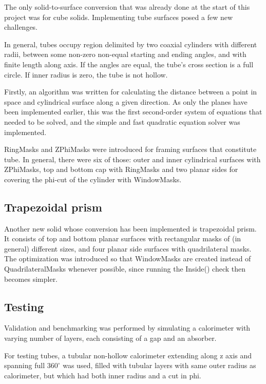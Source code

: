 \documentclass[12pt, a4paper]{article}
\begin{document}
The only solid-to-surface conversion that was already done at the start of this project was for cube solids. Implementing tube surfaces posed a few new challenges.

In general, tubes occupy region delimited by two coaxial cylinders with different radii, between some non-zero non-equal starting and ending angles, and with finite length along axis. If the angles are equal, the tube's cross section is a full circle. If inner radius is zero, the tube is not hollow.

Firstly, an algorithm was written for calculating the distance between a point in space and cylindrical surface along a given direction. As only the planes have been implemented earlier, this was the first second-order system of equations that needed to be solved, and the simple and fast quadratic equation solver was implemented.

RingMasks and ZPhiMasks were introduced for framing surfaces that constitute tube. In general, there were six of those: outer and inner cylindrical surfaces with ZPhiMasks, top and bottom cap with RingMasks and two planar sides for covering the phi-cut of the cylinder with WindowMasks.


\subsection{Trapezoidal prism}

Another new solid whose conversion has been implemented is trapezoidal prism. It consists of top and bottom planar surfaces with rectangular masks of (in general) different sizes, and four planar side surfaces with quadrilateral masks. The optimization was introduced so that WindowMasks are created instead of QuadrilateralMasks whenever possible, since running the {\selectfont Inside()} check then becomes simpler.


\subsection{Testing}

Validation and benchmarking was performed by simulating a calorimeter with varying number of layers, each consisting of a gap and an absorber.

For testing tubes, a tubular non-hollow calorimeter extending along z axis and spanning full $360^\circ$ was used, filled with tubular layers with same outer radius as calorimeter, but which had both inner radius and a cut in phi.
\end{document}
